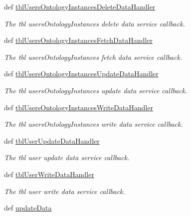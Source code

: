 \begin{DoxyCompactItemize}
def \hyperlink{classmysql__wrapper_1_1MySQLdbWrapper_a3f37621ad4ceb508089eab2d771acf3a}{tbl\-Users\-Ontology\-Instances\-Delete\-Data\-Handler}
\begin{DoxyCompactList}\small\item\em The tbl users\-Ontology\-Instances delete data service callback. \end{DoxyCompactList}\item 
def \hyperlink{classmysql__wrapper_1_1MySQLdbWrapper_ad12e84cd9bb7df7b37e6f0b3fcb7d6db}{tbl\-Users\-Ontology\-Instances\-Fetch\-Data\-Handler}
\begin{DoxyCompactList}\small\item\em The tbl users\-Ontology\-Instances fetch data service callback. \end{DoxyCompactList}\item 
def \hyperlink{classmysql__wrapper_1_1MySQLdbWrapper_aaf7fd83ebfe3283f72bc89d3a11c35d3}{tbl\-Users\-Ontology\-Instances\-Update\-Data\-Handler}
\begin{DoxyCompactList}\small\item\em The tbl users\-Ontology\-Instances update data service callback. \end{DoxyCompactList}\item 
def \hyperlink{classmysql__wrapper_1_1MySQLdbWrapper_aade20891d778433ddfa891259c4921bf}{tbl\-Users\-Ontology\-Instances\-Write\-Data\-Handler}
\begin{DoxyCompactList}\small\item\em The tbl users\-Ontology\-Instances write data service callback. \end{DoxyCompactList}\item 
def \hyperlink{classmysql__wrapper_1_1MySQLdbWrapper_a0f7ae0d2fea4032af50300909453d1b1}{tbl\-User\-Update\-Data\-Handler}
\begin{DoxyCompactList}\small\item\em The tbl user update data service callback. \end{DoxyCompactList}\item 
def \hyperlink{classmysql__wrapper_1_1MySQLdbWrapper_a3d4fb78d30506a53efaf0d5b39226c16}{tbl\-User\-Write\-Data\-Handler}
\begin{DoxyCompactList}\small\item\em The tbl user write data service callback. \end{DoxyCompactList}\item 
def \hyperlink{classmysql__wrapper_1_1MySQLdbWrapper_a441de6f184c055c563a85201b96a6ca7}{update\-Data}

\end{DoxyCompactItemize}

